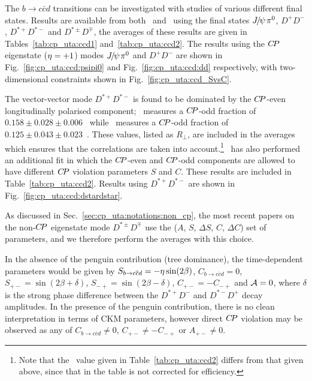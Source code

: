 The $b \to c\bar{c}d$ transitions can be investigated with studies 
of various different final states. 
Results are available from both \babar\  and \belle\ 
using the final states ${J\mskip -3mu/\mskip -2mu\psi\mskip 2mu} \pi^0$, $D^+D^-$, 
$D^{*+}D^{*-}$ and $D^{*\pm}D^{\mp}$,
the averages of these results are given in Tables~\ref{tab:cp_uta:ccd1} and~\ref{tab:cp_uta:ccd2}.
The results using the $C\!P$ eigenstate (${\eta} = +1$) modes
${J\mskip -3mu/\mskip -2mu\psi\mskip 2mu} \pi^0$ and $D^+D^-$
are shown in Fig.~\ref{fig:cp_uta:ccd:psipi0} and 
Fig.~\ref{fig:cp_uta:ccd:dd} respectively,
with two-dimensional constraints shown in Fig.~\ref{fig:cp_uta:ccd_SvsC}.

The vector-vector mode $D^{*+}D^{*-}$ 
is found to be dominated by the $C\!P$-even longitudinally polarised component;
\babar\ measures a $C\!P$-odd fraction of 
$0.158 \pm 0.028 \pm 0.006$~\cite{Aubert:2008ah} while
\belle\ measures a $C\!P$-odd fraction of 
$0.125 \pm 0.043 \pm 0.023$~\cite{:2009za}.
These values, listed as $R_\perp$, are included in the averages which ensures
that the correlations are taken into account.\footnote{
  Note that the \babar\ value given in Table~\ref{tab:cp_uta:ccd2} differs from
  that given above, since that in the table is not corrected for efficiency.
}
\babar\ has also performed an additional fit in which the 
$C\!P$-even and $C\!P$-odd components are allowed to have different 
$C\!P$ violation parameters $S$ and $C$.  
These results are included in Table~\ref{tab:cp_uta:ccd2}.
Results using $D^{*+}D^{*-}$ are shown in Fig.~\ref{fig:cp_uta:ccd:dstardstar}.


As discussed in Sec.~\ref{sec:cp_uta:notations:non_cp}, the most recent papers on the non-$C\!P$ eigenstate mode $D^{*\pm}D^{\mp}$ use the ($A$, $S$, $\Delta S$, $C$, $\Delta C$) set of parameters, and we therefore perform the averages with this choice.



In the absence of the penguin contribution (tree dominance),
the time-dependent parameters would be given by
$S_{b \to c\bar c d} = - \etacp \sin(2\beta)$,
$C_{b \to c\bar c d} = 0$,
$S_{+-} = \sin(2\beta + \delta)$,
$S_{-+} = \sin(2\beta - \delta)$,
$C_{+-} = - C_{-+}$ and 
${\cal A} = 0$,
where $\delta$ is the strong phase difference between the 
$D^{*+}D^-$ and $D^{*-}D^+$ decay amplitudes.
In the presence of the penguin contribution,
there is no clean interpretation in terms of CKM parameters,
however
direct $C\!P$ violation may be observed as any of
$C_{b \to c\bar c d} \neq 0$, $C_{+-} \neq - C_{-+}$ or $A_{+-} \neq 0$.

